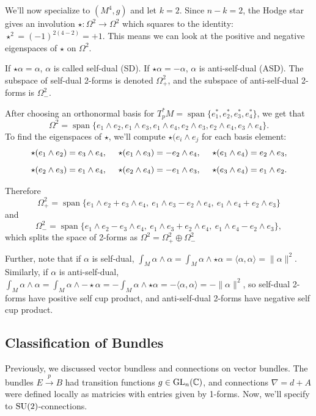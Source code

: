 \documentclass[main]{subfiles}
\begin{document}
We'll now specialize to $(M^4,g)$ and let $k=2$. Since $n-k=2$, the Hodge star gives an involution $\star : \Omega^2 \to \Omega^2$ which squares to the identity: $\star^2 = (-1)^{2(4-2)} = +1$. This means we can look at the positive and negative eigenspaces of $\star$ on $\Omega^2$.

\begin{definition}
If $\star \alpha = \alpha$, $\alpha$ is called self-dual (SD). If $\star \alpha = -\alpha$, $\alpha$ is anti-self-dual (ASD). The subspace of self-dual 2-forms is denoted $\Omega_+^2$, and the subspace of anti-self-dual 2-forms is $\Omega_-^2$.
\end{definition}

After choosing an orthonormal basis for $T_p^\ast M = \operatorname{span}\{e_1^\ast, e_2^\ast, e_3^\ast, e_4^\ast\}$, we get that \[\Omega^2=\operatorname{span}\{e_1\wedge e_2, e_1\wedge e_3, e_1\wedge e_4, e_2\wedge e_3, e_2\wedge e_4, e_3\wedge e_4\}.\]
To find the eigenspaces of $\star$, we'll compute $\star(e_i\wedge e_j$ for each basis element:
\[
\star(e_1\wedge e_2)=e_3\wedge e_4, \hfill ~~~~ \star(e_1\wedge e_3)=-e_2\wedge e_4, ~~~~ \hfill \star(e_1\wedge e_4)=e_2\wedge e_3,\]
\[\star(e_2\wedge e_3)=e_1\wedge e_4,\hfill ~~~~ \star(e_2\wedge e_4)=-e_1\wedge e_3, ~~~~  \hfill \star(e_3\wedge e_4)=e_1\wedge e_2.\]



Therefore \[\Omega_+^2=\operatorname{span}\{e_1\wedge e_2 + e_3\wedge e_4,\ e_1 \wedge e_3 - e_2\wedge e_4,\ e_1\wedge e_4 + e_2 \wedge e_3\}\]
and \[\Omega_-^2=\operatorname{span}\{e_1\wedge e_2 - e_3\wedge e_4,\ e_1 \wedge e_3 + e_2\wedge e_4,\ e_1\wedge e_4 - e_2 \wedge e_3\},\]
which splits the space of 2-forms as $\Omega^2 = \Omega_+^2 \oplus \Omega_-^2$


Further, note that if $\alpha$ is self-dual, $\int_M \alpha \wedge \alpha = \int_M \alpha \wedge \star \alpha = \langle \alpha,\alpha\rangle = \|\alpha\|^2$.
Similarly, if $\alpha$ is anti-self-dual, $\int_M \alpha \wedge \alpha = \int_M \alpha \wedge -\star\alpha = -\int_M \alpha\wedge\star\alpha = -\langle\alpha,\alpha\rangle = -\|\alpha\|^2$, 
so self-dual 2-forms have positive self cup product, and anti-self-dual 2-forms have negative self cup product. 

\subsection*{Classification of Bundles}

Previously, we discussed vector bundless and connections on vector bundles. 
The bundles $E \xrightarrow{p} B$ had transition functions $g \in \operatorname{GL}_n(\mathbb C)$, and connections $\nabla = d+A$ were defined locally as matricies with entries given by 1-forms.
Now, we'll specify to $\operatorname{SU}(2)$-connections.
\end{document}
